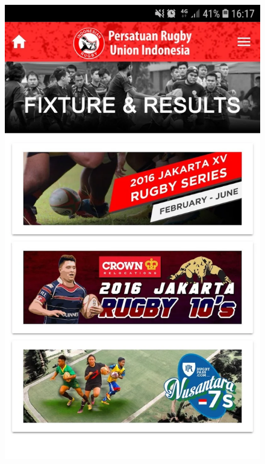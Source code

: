 \documentclass[a4paper,twoside]{article}
\begin{document}
\begin{figure} [!h]
    \includegraphics[scale=0.125]{Images/fixture_results.png} \hspace{0.5cm}

\end{figure}
\end{document}
